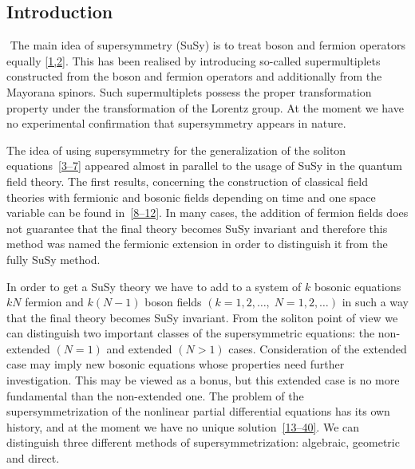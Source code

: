 \subsection{Introduction}

{ %

\ifdefined\VerbMath\(
\newcommand{\bos}{\mathbf{bos}}
\newcommand{\fer}{\mathbf{fer}}
\newcommand{\fun}{\mathbf{fun}}
\newcommand{\gras}{\mathbf{gras}}
\newcommand{\axp}{\mathbf{axp}}
\newcommand{\der}{\mathbf{der}}
\newcommand{\del}{\mathbf{del}}
\newcommand{\pr}{\mathbf{pr}}
\newcommand{\pg}{\mathbf{pg}}
\newcommand{\d}{\mathbf{d}}
\)%
\else
\newcommand{\bos}{\mathbf{bos}}
\newcommand{\fer}{\mathbf{fer}}
\newcommand{\fun}{\mathbf{fun}}
\newcommand{\gras}{\mathbf{gras}}
\newcommand{\axp}{\mathbf{axp}}
\newcommand{\der}{\mathbf{der}}
\newcommand{\del}{\mathbf{del}}
\newcommand{\pr}{\mathbf{pr}}
\newcommand{\pg}{\mathbf{pg}}
\renewcommand{\d}{\mathbf{d}}
\fi
The main idea of supersymmetry (SuSy) is to treat boson and fermion
operators equally \hyperlink{susy2-bib}{[1,2]}.  This has been realised
by introducing so-called supermultiplets constructed from the boson
and fermion operators and additionally from the Mayorana spinors.
Such supermultiplets possess the proper transformation property under
the transformation of the Lorentz group.  At the moment we have no
experimental confirmation that supersymmetry appears in nature.

The idea of using supersymmetry for the generalization of the soliton
equations~\hyperlink{susy2-bib}{[3--7]} appeared almost in parallel to
the usage of SuSy in the quantum field theory.  The first results,
concerning the construction of classical field theories with fermionic
and bosonic fields depending on time and one space variable can be
found in~\hyperlink{susy2-bib}{[8--12]}.  In many cases, the addition
of fermion fields does not guarantee that the final theory becomes
SuSy invariant and therefore this method was named the fermionic
extension in order to distinguish it from the fully SuSy method.

In order to get a SuSy theory we have to add to a system of $k$
bosonic equations $kN$ fermion and $k(N-1)$ boson fields
$(k=1,2,\ldots,\;N=1,2,\ldots)$ in such a way that the final theory
becomes SuSy invariant.  From the soliton point of view we can
distinguish two important classes of the supersymmetric equations: the
non-extended $(N = 1)$ and extended $(N > 1)$ cases.  Consideration of
the extended case may imply new bosonic equations whose properties
need further investigation.  This may be viewed as a bonus, but this
extended case is no more fundamental than the non-extended one.  The
problem of the supersymmetrization of the nonlinear partial
differential equations has its own history, and at the moment we have
no unique solution~\hyperlink{susy2-bib}{[13--40]}.  We can distinguish
three different methods of supersymmetrization: algebraic, geometric
and direct.

}
